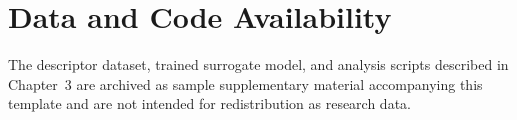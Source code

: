 \section{Data and Code Availability}

The descriptor dataset, trained surrogate model, and analysis scripts
described in Chapter~3 are archived as sample supplementary material
accompanying this template and are not intended for redistribution as
research data.
